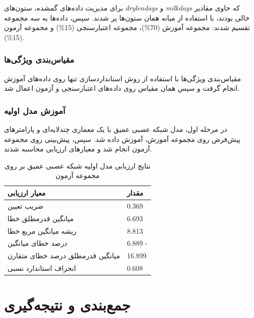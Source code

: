 برای مدیریت داده‌های گمشده، ستون‌های \textit{drylendays} و \textit{milkdays} که حاوی مقادیر خالی بودند، با استفاده از میانه همان ستون‌ها پر شدند. سپس، داده‌ها به سه مجموعه تقسیم شدند: مجموعه آموزش (70\%)، مجموعه اعتبارسنجی (15\%) و مجموعه آزمون (15\%).

\subsubsection{مقیاس‌بندی ویژگی‌ها}

مقیاس‌بندی ویژگی‌ها با استفاده از روش استانداردسازی تنها روی داده‌های آموزش انجام گرفت و سپس همان مقیاس روی داده‌های اعتبارسنجی و آزمون اعمال شد.

\subsubsection{آموزش مدل اولیه}

در مرحله اول، مدل شبکه عصبی عمیق با یک معماری چندلایه‌ای و پارامترهای پیش‌فرض روی مجموعه آموزش، آموزش داده شد. سپس، پیش‌بینی روی مجموعه آزمون انجام شد و معیارهای ارزیابی محاسبه شدند.

\vspace{0.3cm}
\begin{table}[H]
	\centering
	\caption{نتایج ارزیابی مدل اولیه شبکه عصبی عمیق بر روی مجموعه آزمون}
	\renewcommand{\arraystretch}{1.3}
	\begin{tabular}{
			>{\centering\arraybackslash}m{4cm}
			>{\centering\arraybackslash}m{3cm}
		}
		\toprule
		\textbf{معیار ارزیابی} & \textbf{مقدار} \\
		\midrule
		ضریب تعیین & \num{0.369} \\
		میانگین قدرمطلق خطا & \num{6.693} \\
		ریشه میانگین مربع خطا & \num{8.813} \\
		درصد خطای میانگین & \num{6.889} - \\
		میانگین قدرمطلق درصد خطای متقارن & \num{16.899} \\
		انحراف استاندارد نسبی & \num{0.608} \\
		\bottomrule
	\end{tabular}
	\label{tab:dnn_initial}
\end{table}
\vspace{0.5cm}


\section{جمع‌بندی و نتیجه‌گیری}


